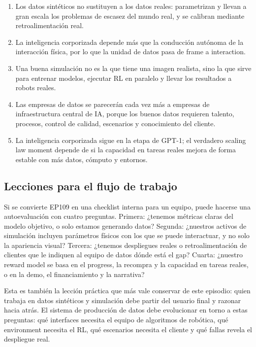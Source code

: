 \begin{enumerate}
\item Los datos sintéticos no sustituyen a los datos reales: parametrizan y llevan a gran escala los problemas de escasez del mundo real, y se calibran mediante retroalimentación real.
\item La inteligencia corporizada depende más que la conducción autónoma de la interacción física, por lo que la unidad de datos pasa de frame a interaction.
\item Una buena simulación no es la que tiene una imagen realista, sino la que sirve para entrenar modelos, ejecutar RL en paralelo y llevar los resultados a robots reales.
\item Las empresas de datos se parecerán cada vez más a empresas de infraestructura central de IA, porque los buenos datos requieren talento, procesos, control de calidad, escenarios y conocimiento del cliente.
\item La inteligencia corporizada sigue en la etapa de GPT-1; el verdadero scaling law moment depende de si la capacidad en tareas reales mejora de forma estable con más datos, cómputo y entornos.
\end{enumerate}

\subsection{Lecciones para el flujo de trabajo}

Si se convierte EP109 en una checklist interna para un equipo, puede hacerse una autoevaluación con cuatro preguntas. Primera: ¿tenemos métricas claras del modelo objetivo, o solo estamos generando datos? Segunda: ¿nuestros activos de simulación incluyen parámetros físicos con los que se puede interactuar, y no solo la apariencia visual? Tercera: ¿tenemos despliegues reales o retroalimentación de clientes que le indiquen al equipo de datos dónde está el gap? Cuarta: ¿nuestro reward model se basa en el progress, la recompra y la capacidad en tareas reales, o en la demo, el financiamiento y la narrativa?

Esta es también la lección práctica que más vale conservar de este episodio: quien trabaja en datos sintéticos y simulación debe partir del usuario final y razonar hacia atrás. El sistema de producción de datos debe evolucionar en torno a estas preguntas: qué interfaces necesita el equipo de algoritmos de robótica, qué environment necesita el RL, qué escenarios necesita el cliente y qué fallas revela el despliegue real.

